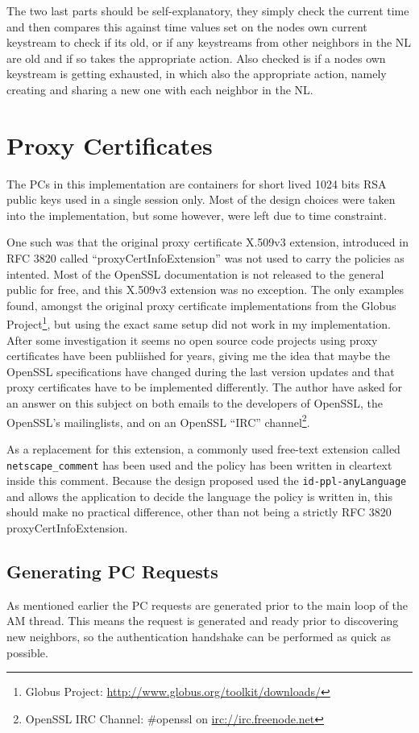 The two last parts should be self-explanatory, they simply check the current
time and then compares this against time values set on the nodes own current
keystream to check if its old, or if any keystreams from other neighbors in the
\ac{NL} are old and if so takes the appropriate action. Also checked is if a
nodes own keystream is getting exhausted, in which also the appropriate action,
namely creating and sharing a new one with each neighbor in the \ac{NL}.


\section{Proxy Certificates}
The \acp{PC} in this implementation are containers for short lived 1024 bits RSA
public keys used in a single session only. Most of the design choices were taken
into the implementation, but some however, were left due to time constraint.

One such was that the original proxy certificate X.509v3 extension, introduced
in RFC 3820 called ``proxyCertInfoExtension'' was not used to carry the policies as
intented. Most of the OpenSSL documentation is not released to the general
public for free, and this X.509v3 extension was no exception. The only examples
found, amongst the original proxy certificate implementations from the Globus
Project\footnote{Globus Project:
\url{http://www.globus.org/toolkit/downloads/}}, but using the exact same setup
did not work in my implementation. After some investigation it seems no open
source code projects using proxy certificates have been publiished for years,
giving me the idea that maybe the OpenSSL specifications have changed during
the last version updates and that proxy certificates have to be implemented
differently. The author have asked for an answer on this subject on both emails
to the developers of OpenSSL, the OpenSSL's mailinglists, and on an
OpenSSL ``IRC'' channel\footnote{OpenSSL IRC Channel: \#openssl on
\url{irc://irc.freenode.net}}.

As a replacement for this extension, a commonly used free-text extension called
\texttt{netscape\_comment} has been used and the policy has been written in
cleartext inside this comment. Because the design proposed used the
\texttt{id-ppl-anyLanguage} and allows the application to decide the language
the policy is written in, this should make no practical difference, other than
not being a strictly RFC 3820 proxyCertInfoExtension.

\subsection{Generating PC Requests}
As mentioned earlier the PC requests are generated prior to the main loop of the
AM thread. This means the request is generated and ready prior to discovering
new neighbors, so the authentication handshake can be performed as quick as
possible.

